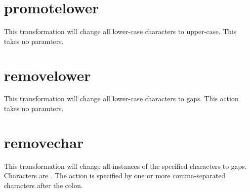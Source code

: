 \documentclass[letterpaper,11pt,english]{sphinxmanual}
\begin{document}
%
\begin{sphinxVerbatim}[commandchars=\\\{\}]
  
 
 
\end{sphinxVerbatim}


\section{promotelower}
\label{\detokenize{mvf_filter_modules:promotelower}}
This transformation will change all lower-case characters to upper-case.
This takes no paramters.

%
\begin{sphinxVerbatim}[commandchars=\\\{\}]
  
 
 
\end{sphinxVerbatim}


\section{removelower}
\label{\detokenize{mvf_filter_modules:removelower}}
This transformation will change all lower-case characters to gaps.
This action takes no paramters.

%
\begin{sphinxVerbatim}[commandchars=\\\{\}]
  
 
 
\end{sphinxVerbatim}


\section{removechar}
\label{\detokenize{mvf_filter_modules:removechar}}
This transformation will change all instances of the specified
characters to gaps. Characters are . The action is
specified by one or more comma-separated characters after the colon.
\end{document}
